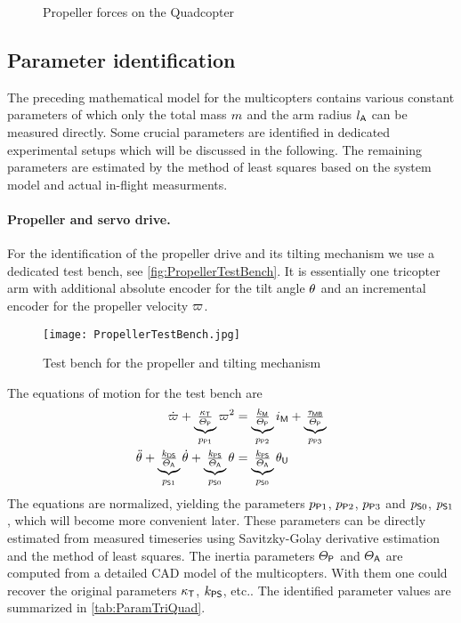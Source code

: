 \begin{figure}[ht]
 \centering
 
 \caption{Propeller forces on the Quadcopter}
 \label{fig:QuadcopterInputs}
\end{figure}


\subsection{Parameter identification}
The preceding mathematical model for the multicopters contains various constant parameters of which only the total mass $\m$ and the arm radius $\ArmRadius$ can be measured directly.
Some crucial parameters are identified in dedicated experimental setups which will be discussed in the following.
The remaining parameters are estimated by the method of least squares based on the system model and actual in-flight measurments.


\paragraph{Propeller and servo drive.}
For the identification of the propeller drive and its tilting mechanism we use a dedicated test bench, see \autoref{fig:PropellerTestBench}.
It is essentially one tricopter arm with additional absolute encoder for the tilt angle $\PropTilt$ and an incremental encoder for the propeller velocity $\PropVel$.

\begin{figure}
 \centering
 \texttt{[image: PropellerTestBench.jpg]}
 \caption{Test bench for the propeller and tilting mechanism}
 \label{fig:PropellerTestBench}
\end{figure}
 
The equations of motion for the test bench are
\begin{align}
 \PropVeld + \underbrace{\tfrac{\kappaT}{\JP}}_{\PropParam[1]} \PropVel^2 &= \underbrace{\tfrac{\BLDCTorqueConstant}{\JP}}_{\PropParam[2]} \BLDCCurr + \underbrace{\tfrac{\BLDCFriction}{\JP}}_{\PropParam[3]}
\\
 \aServodd + \underbrace{\tfrac{\ServoKD}{\JA}}_{\ServoParam[1]} \aServod + \underbrace{\tfrac{\ServoKP}{\JA}}_{\ServoParam[0]} \aServo &= \underbrace{\tfrac{\ServoKP}{\JA}}_{\ServoParam[0]} \aServoU
\end{align}
The equations are normalized, yielding the parameters $\PropParam[1]$, $\PropParam[2]$, $\PropParam[3]$ and $\ServoParam[0]$, $\ServoParam[1]$, which will become more convenient later.
These parameters can be directly estimated from measured timeseries using Savitzky-Golay derivative estimation and the method of least squares.
The inertia parameters $\JP$ and $\JA$ are computed from a detailed CAD model of the multicopters.
With them one could recover the original parameters $\kappaT$, $\ServoKP$, etc.. 
The identified parameter values are summarized in \autoref{tab:ParamTriQuad}.

